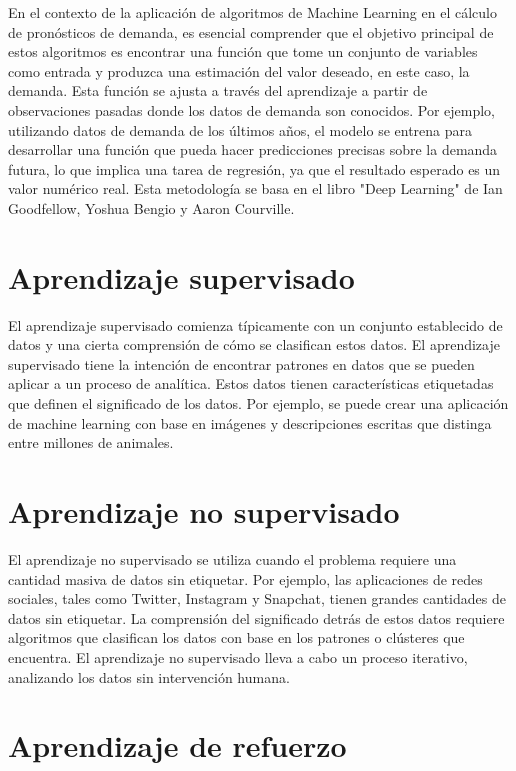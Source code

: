 En el contexto de la aplicación de algoritmos de Machine Learning en el cálculo de pronósticos de demanda, es esencial comprender que el objetivo principal de estos algoritmos es encontrar una función que tome un conjunto de variables como entrada y produzca una estimación del valor deseado, en este caso, la demanda. Esta función se ajusta a través del aprendizaje a partir de observaciones pasadas donde los datos de demanda son conocidos. Por ejemplo, utilizando datos de demanda de los últimos años, el modelo se entrena para desarrollar una función que pueda hacer predicciones precisas sobre la demanda futura, lo que implica una tarea de regresión, ya que el resultado esperado es un valor numérico real. Esta metodología se basa en el libro "Deep Learning" de Ian Goodfellow, Yoshua Bengio y Aaron Courville\cite{goodfellow2016deep}.

\section{Aprendizaje supervisado}

El aprendizaje supervisado comienza típicamente con un conjunto establecido de datos y una cierta comprensión de cómo se clasifican estos datos. El aprendizaje supervisado tiene la intención de encontrar patrones en datos que se pueden aplicar a un proceso de analítica. Estos datos tienen características etiquetadas que definen el significado de los datos. Por ejemplo, se puede crear una aplicación de machine learning con base en imágenes y descripciones escritas que distinga entre millones de animales\cite{ibm}.

\section{Aprendizaje no supervisado}

El aprendizaje no supervisado se utiliza cuando el problema requiere una cantidad masiva de datos sin etiquetar. Por ejemplo, las aplicaciones de redes sociales, tales como Twitter, Instagram y Snapchat, tienen grandes cantidades de datos sin etiquetar. La comprensión del significado detrás de estos datos requiere algoritmos que clasifican los datos con base en los patrones o clústeres que encuentra. El aprendizaje no supervisado lleva a cabo un proceso iterativo, analizando los datos sin intervención humana\cite{ibm}.

\section{Aprendizaje de refuerzo}

